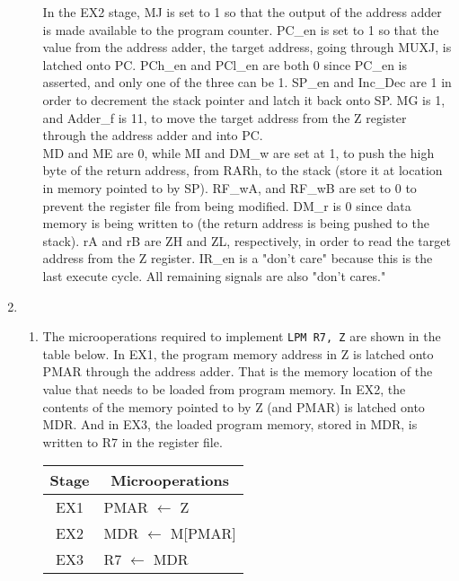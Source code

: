\documentclass[11pt]{article}
\begin{document}
\begin{enumerate}[leftmargin=0.2in]
\begin{enumerate}
      In the EX2 stage, MJ is set to 1 so that the output of the address adder is made available to the program counter. PC\_en is set to 1 so that the value from the address adder, the target address, going through MUXJ, is latched onto PC. PCh\_en and PCl\_en are both 0 since PC\_en is asserted, and only one of the three can be 1. SP\_en and Inc\_Dec are 1 in order to decrement the stack pointer and latch it back onto SP. MG is 1, and Adder\_f is 11, to move the target address from the Z register through the address adder and into PC.\\

      MD and ME are 0, while MI and DM\_w are set at 1, to push the high byte of the return address, from RARh, to the stack (store it at location in memory pointed to by SP). RF\_wA, and RF\_wB are set to 0 to prevent the register file from being modified. DM\_r is 0 since data memory is being written to (the return address is being pushed to the stack). rA and rB are ZH and ZL, respectively, in order to read the target address from the Z register. IR\_en is a "don't care" because this is the last execute cycle. All remaining signals are also "don't cares."

  \end{enumerate}

\item
  \begin{enumerate}
    \item The microoperations required to implement \texttt{LPM R7, Z} are shown in the table below. In EX1, the program memory address in Z is latched onto PMAR through the address adder. That is the memory location of the value that needs to be loaded from program memory. In EX2, the contents of the memory pointed to by Z (and PMAR) is latched onto MDR. And in EX3, the loaded program memory, stored in MDR, is written to R7 in the register file.
      \begin{table}[H]
        \centering
        \begin{tabular}{|c|l|} \hline
          Stage & \multicolumn{1}{c|}{Microoperations} \\ \hline
          EX1 & PMAR $\leftarrow$ Z \\ \hline
          EX2 & MDR $\leftarrow$ M[PMAR] \\ \hline
          EX3 & R7 $\leftarrow$ MDR \\ \hline
        \end{tabular}
        \label{tab:4a}
      \end{table}


\end{enumerate}
\end{enumerate}
\end{document}
